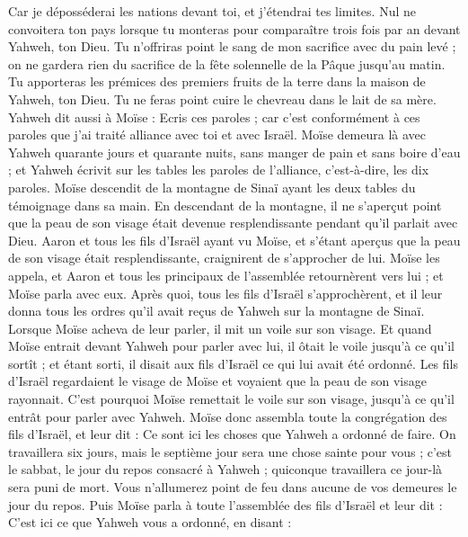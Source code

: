 \begin{multicols}{2}
Car je déposséderai les nations devant toi, et j'étendrai tes limites. Nul ne convoitera ton pays lorsque tu monteras pour comparaître trois fois par an devant Yahweh, ton Dieu.
Tu n'offriras point le sang de mon sacrifice avec du pain levé ; on ne gardera rien du sacrifice de la fête solennelle de la Pâque jusqu’au matin.
Tu apporteras les prémices des premiers fruits de la terre dans la maison de Yahweh, ton Dieu. Tu ne feras point cuire le chevreau dans le lait de sa mère.
Yahweh dit aussi à Moïse : Ecris ces paroles ; car c’est conformément à ces paroles que j'ai traité alliance avec toi et avec Israël.
Moïse demeura là avec Yahweh quarante jours et quarante nuits, sans manger de pain et sans boire d'eau ; et Yahweh écrivit sur les tables les paroles de l'alliance, c'est-à-dire, les dix paroles.
Moïse descendit de la montagne de Sinaï ayant les deux tables du témoignage dans sa main. En descendant de la montagne, il ne s'aperçut point que la peau de son visage était devenue resplendissante pendant qu'il parlait avec Dieu.
Aaron et tous les fils d'Israël ayant vu Moïse, et s'étant aperçus que la peau de son visage était resplendissante, craignirent de s’approcher de lui.
Moïse les appela, et Aaron et tous les principaux de l'assemblée retournèrent vers lui ; et Moïse parla avec eux.
Après quoi, tous les fils d'Israël s'approchèrent, et il leur donna tous les ordres qu’il avait reçus de Yahweh sur la montagne de Sinaï.
Lorsque Moïse acheva de leur parler, il mit un voile sur son visage.
Et quand Moïse entrait devant Yahweh pour parler avec lui, il ôtait le voile jusqu’à ce qu'il sortît ; et étant sorti, il disait aux fils d'Israël ce qui lui avait été ordonné.
Les fils d'Israël regardaient le visage de Moïse et voyaient que la peau de son visage rayonnait. C'est pourquoi Moïse remettait le voile sur son visage, jusqu’à ce qu'il entrât pour parler avec Yahweh.
\VerseOne{}Moïse donc assembla toute la congrégation des fils d'Israël, et leur dit : Ce sont ici les choses que Yahweh a ordonné de faire.
On travaillera six jours, mais le septième jour sera une chose sainte pour vous ; c'est le sabbat, le jour du repos consacré à Yahweh ; quiconque travaillera ce jour-là sera puni de mort.
Vous n'allumerez point de feu dans aucune de vos demeures le jour du repos.
Puis Moïse parla à toute l'assemblée des fils d'Israël et leur dit : C'est ici ce que Yahweh vous a ordonné, en disant :

\end{multicols}
